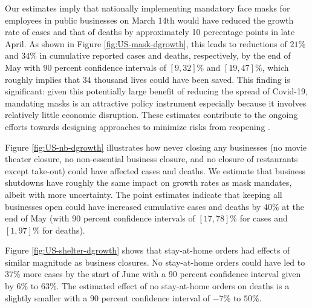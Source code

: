 \documentclass[3p, longtitle]{elsarticle}
\theoremstyle{definition}
\begin{document}
Our estimates imply that nationally implementing mandatory face masks
for employees in public businesses on March 14th would have reduced the
growth rate of cases and that of deaths by approximately 10 percentage
points in late April. As shown in Figure \ref{fig:US-mask-dgrowth},
this leads to reductions of $21$\% and $34$\% in cumulative reported
cases and deaths, respectively, by the end of May with 90 percent
confidence intervals of $[9,32]$\% and $[19,47]$\%, which roughly
implies that 34 thousand lives could have been saved. %
This finding is
significant: given this potentially large benefit of reducing the
spread of Covid-19, mandating masks is an attractive policy instrument
especially because it involves relatively little economic
disruption. These estimates contribute to the ongoing efforts towards
designing approaches to minimize risks from reopening
\citep{stock2020b}.


Figure \ref{fig:US-nb-dgrowth} illustrates how never closing any
businesses (no movie theater closure, no non-essential business
closure, and no closure of restaurants except take-out) could have
affected cases and deaths.  We estimate that business shutdowns have
roughly the same impact on growth rates as mask mandates, albeit with
more uncertainty. The point estimates indicate that keeping all
businesses open could have increased cumulative cases and deaths by
$40\%$ at the end of May (with 90 percent confidence intervals of
$[17,78]$\% for cases and $[1,97]$\% for deaths).

Figure \ref{fig:US-shelter-dgrowth} shows that stay-at-home orders had
effects of similar magnitude as business closures.  No stay-at-home
orders could have led to $37$\% more cases by the start of June with a
90 percent confidence interval given by $6$\% to $63$\%. The estimated
effect of no stay-at-home orders on deaths is a slightly smaller with
a 90 percent confidence interval of $-7$\% to $50$\%.
\end{document}
